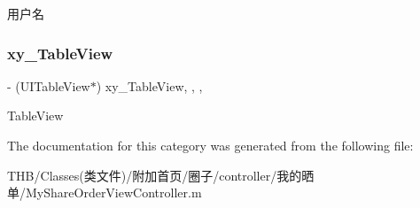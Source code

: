 用户名 \mbox{\label{category_my_share_order_view_controller_07_08_a4daeac0fa2e0ae38d5fd14a1d40114ed}} 
\subsubsection{\texorpdfstring{xy\+\_\+\+Table\+View}{xy\_TableView}}
{\footnotesize\ttfamily -\/ (U\+I\+Table\+View$\ast$) xy\+\_\+\+Table\+View\hspace{0.3cm}{\ttfamily [read]}, {\ttfamily [write]}, {\ttfamily [nonatomic]}, {\ttfamily [strong]}}

Table\+View 

The documentation for this category was generated from the following file\+:\begin{DoxyCompactItemize}
\item 
T\+H\+B/\+Classes(类文件)/附加首页/圈子/controller/我的晒单/My\+Share\+Order\+View\+Controller.\+m\end{DoxyCompactItemize}

